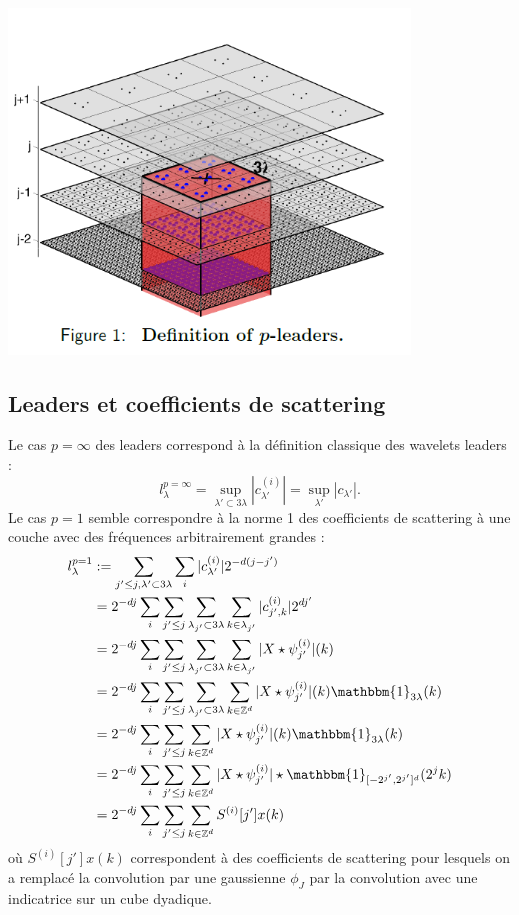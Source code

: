\documentclass[11pt]{article} %
\begin{document}
	\includegraphics[width=0.8\textwidth]{p_lead}
	\subsection{Leaders et coefficients de scattering}
	Le cas $p=\infty$ des leaders correspond à la définition classique des wavelets leaders :
	\begin{equation}
		l_\lambda^{p=\infty} = \sup_{\lambda'\subset 3\lambda}|c_{\lambda'}^{(i)}| = \sup_{\lambda'} |c_{\lambda'}|.
	\end{equation}
	Le cas $p=1$ semble correspondre à la norme 1 des coefficients de scattering à une couche avec des fréquences arbitrairement grandes :
	\begin{align}
		l_\lambda^{p=1} 	&:= \sum_{j'\leq j, \lambda' \subset 3\lambda} \sum_i |c_{\lambda'}^{(i)}| 2^{-d(j-j')} \\
						&= 2^{-dj}\sum_i \sum_{j' \leq j} \sum_{\lambda_{j'} \subset 3\lambda} \sum_{k\in \lambda_{j'}} |c_{j',k}^{(i)}| 2^{dj'} \\
						&= 2^{-dj}\sum_i \sum_{j' \leq j} \sum_{\lambda_{j'} \subset 3\lambda} \sum_{k\in \lambda_{j'}} |X\star\psi_{j'}^{(i)}| (k) \\
						&= 2^{-dj}\sum_i \sum_{j' \leq j} \sum_{\lambda_{j'} \subset 3\lambda} \sum_{k\in \mathbb{Z}^d} |X\star\psi_{j'}^{(i)}| (k) \mathbbm{1}_{3\lambda}(k)\\
						&= 2^{-dj}\sum_i \sum_{j' \leq j} \sum_{k\in \mathbb{Z}^d} |X\star\psi_{j'}^{(i)}| (k) \mathbbm{1}_{3\lambda}(k)\\
						&= 2^{-dj}\sum_i \sum_{j' \leq j} \sum_{k\in \mathbb{Z}^d} |X\star\psi_{j'}^{(i)}| \star \mathbbm{1}_{[-2^{j'}, 2^{j'}]^d}(2^j k)\\
						&= 2^{-dj}\sum_i \sum_{j' \leq j} \sum_{k\in \mathbb{Z}^d} S^{(i)}[j']x(k)\\
	\end{align}
	où $S^{(i)}[j']x(k)$ correspondent à des coefficients de scattering pour lesquels on a remplacé la convolution par une gaussienne $\phi_J$ par la convolution avec une indicatrice sur un cube dyadique.
\end{document}
